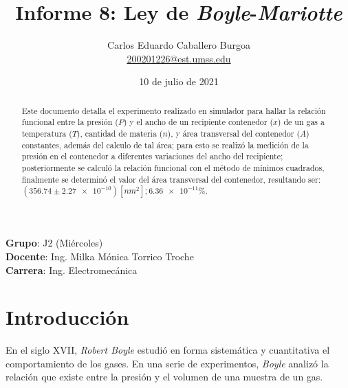 \documentclass[letter,11pt]{article}
\title{Informe 8: Ley de \emph{Boyle}-\emph{Mariotte}}
\author{Carlos Eduardo Caballero Burgoa \\
    \small{\href{mailto:200201226@est.umss.edu}{200201226@est.umss.edu}}
}
\date{10 de julio de 2021}
\begin{document}
\maketitle
\begin{center}
    \textbf{Grupo}: J2 (Miércoles)\\
    \textbf{Docente}: Ing. Milka Mónica Torrico Troche\\
    \textbf{Carrera}: Ing. Electromecánica
\end{center}

\begin{abstract}
Este documento detalla el experimento realizado en simulador para hallar la
relación funcional entre la presión ($P$) y el ancho de un recipiente
contenedor ($x$) de un gas a temperatura ($T$), cantidad de materia ($n$), y
área transversal del contenedor ($A$) constantes, además del calculo de tal
área; para esto se realizó la medición de la presión en el contenedor a
diferentes variaciones del ancho del recipiente; posteriormente se calculó la
relación funcional con el método de mínimos cuadrados, finalmente se determinó
el valor del área transversal del contenedor, resultando ser:
$(356.74 \pm \num{2.27e-10}) [nm^2]; \num{6.36e-11}\%$.
\end{abstract}

\section{Introducción}

En el siglo XVII, \emph{Robert Boyle} estudió en forma sistemática y
cuantitativa el comportamiento de los gases. En una serie de experimentos,
\emph{Boyle} analizó la relación que existe entre la presión y el volumen de una
muestra de un gas. 
\end{document}
